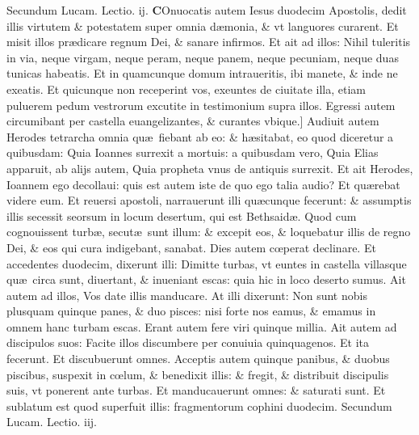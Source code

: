 \documentclass[a5paper,10pt]{book}
\def\leftmarginnote{%
	\lrmarginnote{\hskip -\marginparsep \hskip -6.5em}}
\def\ae{æ}
\def\oe{œ}
\begin{document}
\begin{multicols*}{2}
\newline \color{red} Secundum Lucam. \hfill Lectio. ij. \color{black}
\vspace{-.25em}
\lettrine[lines=2]{\bfseries \color{red} C}{}\textdagger Onuocatis\leftmarginnote{\begin{flushright}c.9.a\end{flushright}} autem Iesus duodecim Apostolis, dedit illis virtutem \& potestatem super omnia d\ae monia, \& vt languores curarent.
Et misit illos pr\ae dicare regnum Dei, \& sanare infirmos.
Et ait ad illos: Nihil tuleritis in via, neque virgam, neque peram, neque panem, neque pecuniam, neque duas tunicas habeatis. 
Et in quamcunque domum intraueritis, ibi manete, \& inde ne exeatis.
Et quicunque non receperint vos, exeuntes de ciuitate illa, etiam puluerem pedum vestrorum excutite in testimonium supra illos.
Egressi autem circumibant per castella euangelizantes,
\& curantes vbique.]\leftmarginnote{\begin{flushright}B\end{flushright}}
\newline \indent Audiuit autem Herodes tetrarcha omnia qu\ae \ fiebant ab eo: \& h\ae sitabat, eo quod diceretur a quibusdam: Quia Ioannes surrexit a mortuis: a quibusdam vero, Quia Elias apparuit, ab alijs autem, Quia propheta vnus de antiquis surrexit.
Et ait Herodes, Ioannem ego decollaui: quis est autem iste de quo ego talia audio? Et qu\ae rebat videre eum. Et reuersi apostoli, narrauerunt illi qu\ae cunque fecerunt: \& assumptis illis secessit seorsum in locum desertum, qui est Bethsaid\ae .
Quod cum cognouissent turb\ae , secut\ae \ sunt illum: \& excepit eos, \& loquebatur illis de regno Dei, \& eos qui cura indigebant, sanabat.
Dies autem c\oe perat declinare. Et accedentes duodecim, dixerunt illi: Dimitte turbas, vt euntes in castella villasque qu\ae \ circa sunt, diuertant, \& inueniant escas: quia hic in loco deserto sumus.
Ait autem ad illos, Vos date illis manducare. At illi dixerunt: Non sunt nobis plusquam quinque panes, \& duo pisces: nisi forte nos eamus, \& emamus in omnem hanc turbam escas.
Erant autem fere viri quinque millia. Ait autem ad discipulos suos: Facite illos discumbere per conuiuia quinquagenos.
Et ita fecerunt. Et discubuerunt omnes.
Acceptis autem quinque panibus, \& duobus piscibus, suspexit in c\oe lum, \& benedixit illis: \& fregit, \& distribuit discipulis suis, vt ponerent ante turbas.
Et manducauerunt omnes: \& saturati sunt. Et sublatum est quod superfuit illis: fragmentorum cophini duodecim.
\newline \color{red} Secundum Lucam. Lectio. iij. \color{black}

\end{multicols*}
\end{document}
